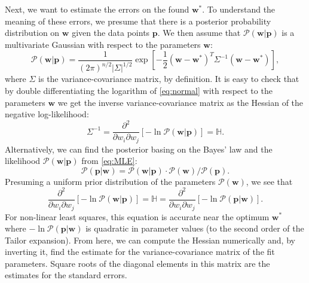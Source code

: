 \documentclass[%
 aip,
 draft,
 amsmath,amssymb,
 reprint,%
]{revtex4-1}
\begin{document}
Next, we want to estimate the errors on the found  $\mathbf{w}^*$. To understand the meaning of these errors, we presume that there is a posterior probability distribution on $\mathbf{w}$ given the data points $\mathbf{p}$. We then assume that $\mathcal{P}(\mathbf{w}|\mathbf{p})$ is a multivariate Gaussian with respect to the parameters $\mathbf{w}$:
\begin{equation}
\mathcal{P}(\mathbf{w}|\mathbf{p}) = \frac{1}{(2\pi)^{n/2} |\Sigma|^{1/2}} \exp \left[-\frac{1}{2}(\mathbf{w}-\mathbf{w}^*)^T \Sigma^{-1}(\mathbf{w}-\mathbf{w}^*)\right],
\label{eq:normal}
\end{equation}
where $\Sigma$ is the variance-covariance matrix, by definition. It is easy to check that by double differentiating the logarithm of \eqref{eq:normal} with respect to the parameters $\mathbf{w}$ we get the inverse variance-covariance matrix as the Hessian of the negative log-likelihood:
\begin{equation}
\Sigma^{-1} = \frac{\partial^2 }{\partial w_i \partial w_j}[-\ln \mathcal{P}(\mathbf{w}|\mathbf{p})] = \mathbb{H}.
\end{equation}
Alternatively, we can find the posterior basing on the Bayes' law and the likelihood $\mathcal{P}(\mathbf{w}|\mathbf{p})$ from \eqref{eq:MLE}:
\begin{equation}
\mathcal{P}(\mathbf{p}|\mathbf{w}) = \mathcal{P}(\mathbf{w}|\mathbf{p}) \cdot \mathcal{P}(\mathbf{w})/\mathcal{P}(\mathbf{p}).
\end{equation}
Presuming a uniform prior distribution of the parameters $\mathcal{P}(\mathbf{w})$, we see that
\begin{equation}
\frac{\partial^2 }{\partial w_i \partial w_j}[-\ln \mathcal{P}(\mathbf{w}|\mathbf{p})] = \mathbb{H} = \frac{\partial^2 }{\partial w_i \partial w_j}[-\ln \mathcal{P}(\mathbf{p}|\mathbf{w})].
\end{equation}
For non-linear least squares, this equation is accurate near the optimum $\mathbf{w}^*$ where $-\ln \mathcal{P}(\mathbf{p}|\mathbf{w})$ is quadratic in parameter values (to the second order of the Tailor expansion). From here, we can compute the Hessian numerically and, by inverting it, find the estimate for the variance-covariance matrix of the fit parameters. Square roots of the diagonal elements in this matrix are the estimates for the standard errors.

\listoffixmes
\end{document}
